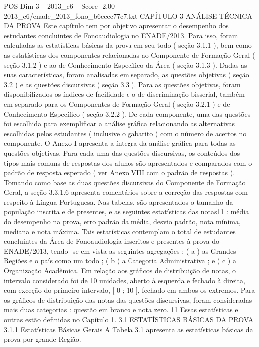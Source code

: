 \begin{textsample}{POS Dim 3 – 2013\_c6 – Score -2.00 – 2013\_c6/enade\_2013\_fono\_b6ccec77c7.txt}  \label{ex:f3_pos_229}
CAPÍTULO 3 ANÁLISE TÉCNICA DA PROVA Este capítulo tem por objetivo apresentar o desempenho dos estudantes concluintes de Fonoaudiologia no ENADE/2013.
Para isso, foram calculadas as estatísticas básicas da prova em seu todo ( seção 3.1.1 ), bem como as estatísticas dos componentes relacionadas ao Componente de Formação Geral ( seção 3.1.2 ) e ao de Conhecimento Específico da Área ( seção 3.1.3 ).
Dadas as suas características, foram analisadas em separado, as questões objetivas ( seção 3.2 ) e as questões discursivas ( seção 3.3 ).
Para as questões objetivas, foram disponibilizados os índices de facilidade e o de discriminação bisserial, também em separado para os Componentes de Formação Geral ( seção 3.2.1 ) e de Conhecimento Específico ( seção 3.2.2 ).
De cada componente, uma das questões foi escolhida para exemplificar a análise gráfica relacionando as alternativas escolhidas pelos estudantes ( inclusive o gabarito ) com o número de acertos no componente.
O Anexo I apresenta a íntegra da análise gráfica para todas as questões objetivas.
Para cada uma das questões discursivas, os conteúdos dos tipos mais comuns de respostas dos alunos são apresentados e comparados com o padrão de resposta esperado ( ver Anexo VIII com o padrão de respostas ).
Tomando como base as duas questões discursivas do Componente de Formação Geral, a seção 3.3.1.6 apresenta comentários sobre a correção das respostas com respeito à Língua Portuguesa.
Nas tabelas, são apresentados o tamanho da população inscrita e de presentes, e as seguintes estatísticas das notas11 : média do desempenho na prova, erro padrão da média, desvio padrão, nota mínima, mediana e nota máxima.
Tais estatísticas contemplam o total de estudantes concluintes da Área de Fonoaudiologia inscritos e presentes à prova do ENADE/2013, tendo -se em vista as seguintes agregações : ( a ) as Grandes Regiões e o país como um todo ; ( b ) a Categoria Administrativa ; e ( c ) a Organização Acadêmica.
Em relação aos gráficos de distribuição de notas, o intervalo considerado foi de 10 unidades, aberto à esquerda e fechado à direita, com exceção do primeiro intervalo, [ 0 ; 10 ], fechado em ambos os extremos.
Para os gráficos de distribuição das notas das questões discursivas, foram consideradas mais duas categorias : questão em branco e nota zero. 11 Essas estatísticas e outras estão definidas no Capítulo 1. 3.1 ESTATÍSTICAS BÁSICAS DA PROVA 3.1.1 Estatísticas Básicas Gerais A Tabela 3.1 apresenta as estatísticas básicas da prova por grande Região.

\end{textsample}
